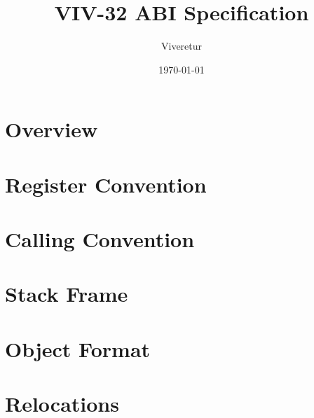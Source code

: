 \documentclass[11pt,a4paper]{report}
\title{VIV-32 ABI Specification}
\author{Viveretur}
\date{\today}
\begin{document}
\maketitle
\tableofcontents

\chapter{Overview}


\chapter{Register Convention}


\chapter{Calling Convention}


\chapter{Stack Frame}


\chapter{Object Format}


\chapter{Relocations}

\end{document}
